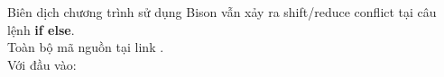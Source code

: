 \documentclass[../report.tex]{subfiles}
\begin{document}
Biên dịch chương trình sử dụng Bison vẫn xảy ra shift/reduce 
conflict tại câu lệnh \textbf{if else}. \\
Toàn bộ mã nguồn tại link \cite{source-code}. \\[3mm]
Với đầu vào: 
\begin{lstlisting}
\end{lstlisting}
\end{document}
